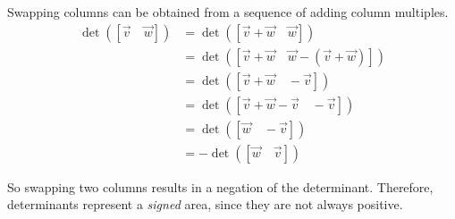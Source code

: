\begin{applicationActivities}
\begin{observation}
Swapping columns can be obtained from a sequence of adding column multiples.
  \begin{align*}
  \det([\vec{v}\hspace{1em}\vec{w}])
&=
  \det([\vec{v}+\vec{w}\hspace{1em}\vec{w}])
\\ &=
  \det([\vec{v}+\vec{w}\hspace{1em}\vec{w}-(\vec{v}+\vec{w})])
\\ &=
  \det([\vec{v}+\vec{w}\hspace{1em}-\vec{v}])
\\ &=
  \det([\vec{v}+\vec{w}-\vec{v}\hspace{1em}-\vec{v}])
\\ &=
  \det([\vec{w}\hspace{1em}-\vec{v}])
\\ &=
  -\det([\vec{w}\hspace{1em}\vec{v}])
  \end{align*}

So swapping two columns results in a negation of the
determinant.  Therefore, determinants represent a \textit{signed} area, since they are not always
positive.
\end{observation}




\end{applicationActivities}
